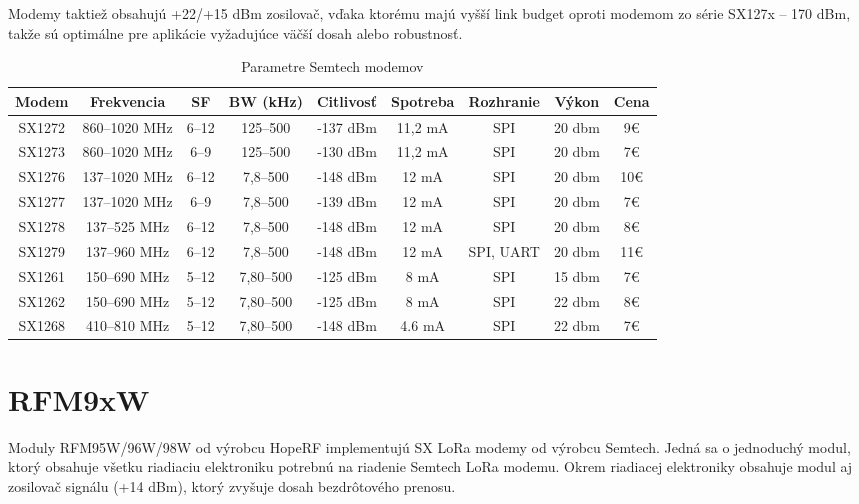 \documentclass[slovak,master]{diploma}
\begin{document}
Modemy taktiež obsahujú +22/+15 dBm zosilovač, vďaka ktorému majú vyšší link budget oproti modemom zo série SX127x -- 170 dBm,
takže sú optimálne pre aplikácie vyžadujúce väčší dosah alebo robustnosť.

\begin{table}[!h]
	\centering
  \small
  \setlength\tabcolsep{6pt}
	\caption[Parametre Semtech modemov]{Parametre Semtech modemov}
  \begin{tabular}{c|c|c|c|c|c|c|c|c}
    \toprule
    Modem & Frekvencia & SF & BW (kHz) & Citlivosť & Spotreba \footnotemark[0] & Rozhranie & Výkon\footnotemark[1] & Cena\footnotemark[2]\\
    \midrule
    SX1272 & 860--1020 MHz & 6--12 & 125--500 & -137 dBm & 11,2 mA & SPI & 20 dbm & 9€ \\
    SX1273 & 860--1020 MHz & 6--9 & 125--500 & -130 dBm & 11,2 mA & SPI & 20 dbm & 7€ \\
    SX1276 & 137--1020 MHz & 6--12 & 7,8--500 & -148 dBm & 12 mA & SPI & 20 dbm & 10€ \\
    SX1277 & 137--1020 MHz & 6--9 & 7,8--500 & -139 dBm & 12 mA & SPI & 20 dbm & 7€ \\
    SX1278 & 137--525 MHz & 6--12 & 7,8--500 & -148 dBm & 12 mA & SPI & 20 dbm & 8€ \\
    SX1279 & 137--960 MHz & 6--12 & 7,8--500 & -148 dBm & 12 mA & SPI, UART & 20 dbm & 11€ \\
    \hline
    SX1261 & 150--690 MHz & 5--12 & 7,80--500 & -125 dBm & 8 mA & SPI & 15 dbm & 7€ \\
    SX1262 & 150--690 MHz & 5--12 & 7,80--500 & -125 dBm & 8 mA & SPI & 22 dbm & 8€ \\
    SX1268 & 410--810 MHz & 5--12 & 7,80--500 & -148 dBm & 4.6 mA & SPI & 22 dbm & 7€ \\
    \midrule
  \end{tabular}
\end{table}

\section{RFM9xW}
Moduly RFM95W/96W/98W od výrobcu HopeRF \cite{hoperf} implementujú SX LoRa modemy od výrobcu Semtech.
Jedná sa o jednoduchý modul, ktorý obsahuje všetku riadiaciu elektroniku potrebnú na riadenie Semtech LoRa modemu.
Okrem riadiacej elektroniky obsahuje modul aj zosilovač signálu (+14 dBm), ktorý zvyšuje dosah bezdrôtového prenosu.
\end{document}
